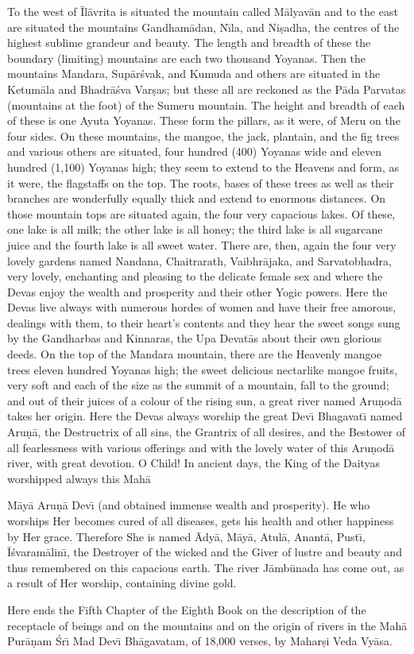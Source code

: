 To the west of \=Il\=avrita is situated the mountain called M\=alyav\=an and to the east are situated the mountains Gandham\=adan, N\={\i}la, and Ni\d{s}adha, the centres of the highest sublime grandeur and beauty. The length and breadth of these the boundary (limiting) mountains are each two thousand Yoyanas. Then the mountains Mandara, Sup\=ar\'svak, and Kumuda and others are situated in the Ketum\=ala and Bhadr\=a\'sva Var\d{s}as; but these all are reckoned as the P\=ada Parvatas (mountains at the foot) of the Sumeru mountain. The height and breadth of each of these is one Ayuta Yoyanas. These form the pillars, as it were, of Meru on the four sides. On these mountains, the mangoe, the jack, plantain, and the fig trees and various others are situated, four hundred (400) Yoyanas wide and eleven hundred (1,100) Yoyanas high; they seem to extend to the Heavens and form, as it were, the flagstaffs on the top. The roots, bases of these trees as well as their branches are wonderfully equally thick and extend to enormous distances. On those mountain tops are situated again, the four very capacious lakes. Of these, one lake is all milk; the other lake is all honey; the third lake is all sugarcane juice and the fourth lake is all sweet water. There are, then, again the four very lovely gardens named Nandana, Chaitrarath, Vaibhr\=ajaka, and Sarvatobhadra, very lovely, enchanting and pleasing to the delicate female sex and where the Devas enjoy the wealth and prosperity and their other Yogic powers. Here the Devas live always with numerous hordes of women and have their free amorous, dealings with them, to their heart's contents and they hear the sweet songs sung by the Gandharbas and Kinnaras, the Upa Devat\=as about their own glorious deeds. On the top of the Mandara mountain, there are the Heavenly mangoe trees eleven hundred Yoyanas high; the sweet delicious nectarlike mangoe fruits, very soft and each of the size as the summit of a mountain, fall to the ground; and out of their juices of a colour of the rising sun, a great river named Aru\d{n}od\=a takes her origin. Here the Devas always worship the great Dev\={\i} Bhagavat\={\i} named Aru\d{n}\=a, the Destructrix of all sins, the Grantrix of all desires, and the Bestower of all fearlessness with various offerings and with the lovely water of this Aru\d{n}od\=a river, with great devotion. O Child! In ancient days, the King of the Daityas worshipped always this Mah\=a

M\=ay\=a Aru\d{n}\=a Dev\={\i} (and obtained immense wealth and prosperity). He who worships Her becomes cured of all diseases, gets his health and other happiness by Her grace. Therefore She is named \=Ady\=a, M\=ay\=a, Atul\=a, Anant\=a, Pust\={\i}, \=I\'svaram\=alin\={\i}, the Destroyer of the wicked and the Giver of lustre and beauty and thus remembered on this capacious earth. The river J\=amb\=unada has come out, as a result of Her worship, containing divine gold.

Here ends the Fifth Chapter of the Eighth Book on the description of the receptacle of beings and on the mountains and on the origin of rivers in the Mah\=a Pur\=a\d{n}am \'Sr\={\i} Mad Dev\={\i} Bh\=agavatam, of 18,000 verses, by Mahar\d{s}i Veda Vy\=asa.



